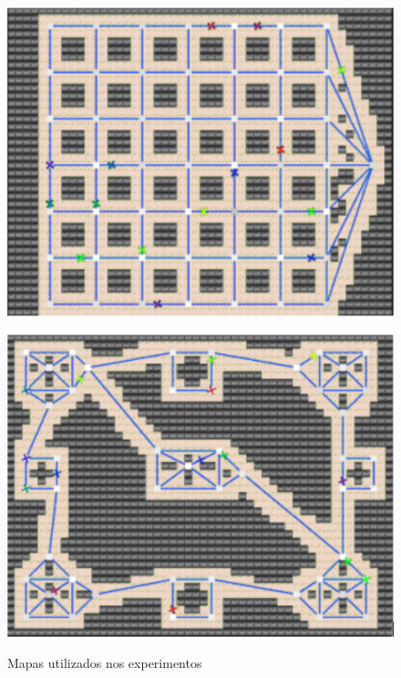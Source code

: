\begin{figure}[tp]
	\caption[Mapas utilizados nos experimentos]{Mapas utilizados nos 
		experimentos}
	\centering
	\begin{minipage}{0.5\textwidth}
		\centering
		\includegraphics[width=0.9\linewidth]{images/mapa_grid.png}
		\label{fig:grid}
	\end{minipage}\hfill
	\begin{minipage}{0.5\textwidth}
		\centering
		\includegraphics[width=0.9\linewidth]{images/mapa_ilhas.png}
		\label{fig:islands}
	\end{minipage}
	\begin{minipage}{0.5\textwidth}
		\centering

\end{minipage}
\end{figure}
